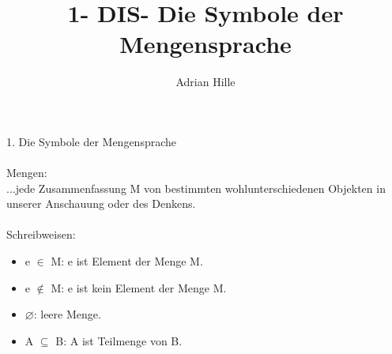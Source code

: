 \documentclass{scrartcl}\usepackage[utf8]{inputenc}
\title{1- DIS- Die Symbole der Mengensprache}
\author{Adrian Hille}
\begin{document}
\Large 1. Die Symbole der Mengensprache
\\
\\
\normalsize
Mengen: \\ 
...jede Zusammenfassung M von bestimmten wohlunterschiedenen Objekten in unserer Anschauung oder des Denkens.\\
\\
Schreibweisen: 
   \begin{itemize}
    	\item e $\in$ M: e ist Element der Menge M.
    	\item e $\notin$ M: e ist kein Element der Menge M.
  	\item $\varnothing$: leere Menge.
    	\item A $\subseteq$ B: A ist Teilmenge von B.
    \end{itemize}
\end{document}
